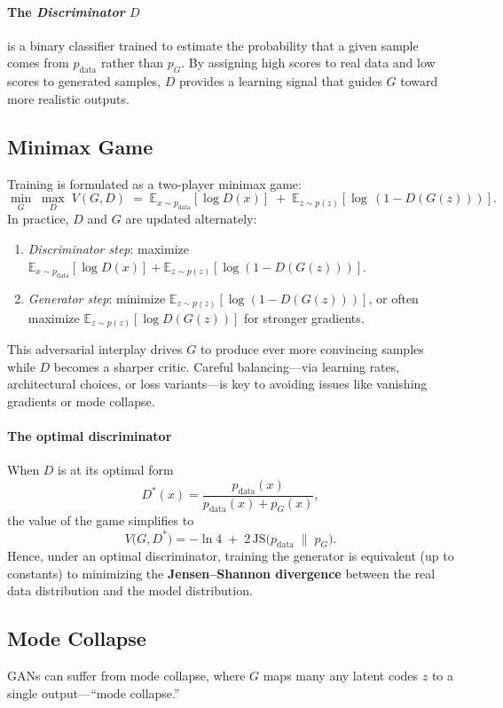 \documentclass{article}
\begin{document}
\paragraph{The \emph{Discriminator} \(D\)} is a binary classifier trained to estimate the probability that a given sample comes from \(p_{\mathrm{data}}\) rather than \(p_G\). By assigning high scores to real data and low scores to generated samples, \(D\) provides a learning signal that guides \(G\) toward more realistic outputs.  

\subsection{Minimax Game}
Training is formulated as a two‐player minimax game:
\[
  \min_G \;\max_D\; V(G,D)
  \;=\;\mathbb{E}_{x\sim p_{\mathrm{data}}}[\log D(x)]
  \;+\;\mathbb{E}_{z\sim p(z)}[\log\,(1 - D(G(z)))].
\]
In practice, \(D\) and \(G\) are updated alternately:  
\begin{enumerate}
  \item \emph{Discriminator step}: maximize \(\mathbb{E}_{x\sim p_{\mathrm{data}}}[\log D(x)] + \mathbb{E}_{z\sim p(z)}[\log(1 - D(G(z)))]\).  
  \item \emph{Generator step}: minimize \(\mathbb{E}_{z\sim p(z)}[\log(1 - D(G(z)))]\), or often maximize \(\mathbb{E}_{z\sim p(z)}[\log D(G(z))]\) for stronger gradients.  
\end{enumerate}
This adversarial interplay drives \(G\) to produce ever more convincing samples while \(D\) becomes a sharper critic. Careful balancing—via learning rates, architectural choices, or loss variants—is key to avoiding issues like vanishing gradients or mode collapse.  

\paragraph{The optimal discriminator} When \(D\) is at its optimal form
\[
  D^*(x)
  = \frac{p_{\mathrm{data}}(x)}{p_{\mathrm{data}}(x)+p_G(x)},
\]
the value of the game simplifies to
\[
  V\bigl(G,D^*\bigr)
  = -\ln 4 \;+\; 2\,\mathrm{JS}\bigl(p_{\mathrm{data}}\;\|\;p_G\bigr).
\]
Hence, under an optimal discriminator, training the generator is equivalent (up to constants) to minimizing the \textbf{Jensen–Shannon divergence} between the real data distribution and the model distribution.

\subsection{Mode Collapse}
GANs can suffer from mode collapse, where $G$ maps many any latent codes $z$ to a single output—“mode collapse.”  
\end{document}
